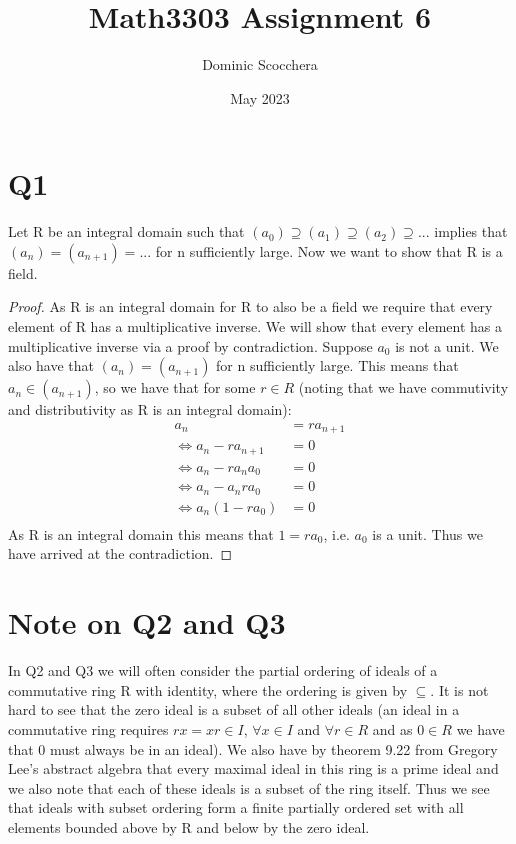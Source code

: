\documentclass{article}
\title{Math3303 Assignment 6}
\author{Dominic Scocchera}
\date{May 2023}
\theoremstyle{definition}
\begin{document}
\maketitle
\section*{Q1}
Let R be an integral domain such that $(a_0)\supseteq(a_1)\supseteq(a_2)\supseteq...$ implies that $(a_n)=(a_{n+1})=...$ for n sufficiently large. Now we want to show that R is a field.
\begin{proof}
As R is an integral domain for R to also be a field we require that every element of R has a multiplicative inverse. We will show that every element has a multiplicative inverse via a proof by contradiction. Suppose $a_0$ is not a unit. We also have that $(a_n)=(a_{n+1})$ for n sufficiently large. This means that $a_n\in(a_{n+1})$, so we have that for some $r\in R$ (noting that we have commutivity and distributivity as R is an integral domain):
\begin{align*}
a_n&=ra_{n+1}\\
\iff a_n-ra_{n+1}&=0\\
\iff a_n-ra_na_0&=0\\
\iff a_n-a_nra_0&=0\\
\iff a_n(1-ra_0)&=0\\
\end{align*}
As R is an integral domain this means that $1=ra_0$, i.e. $a_0$ is a unit. Thus we have arrived at the contradiction.  
\end{proof}
\section*{Note on Q2 and Q3}
In Q2 and Q3 we will often consider the partial ordering of ideals of a commutative ring R with identity, where the ordering is given by $\subseteq$. It is not hard to see that the zero ideal is a subset of all other ideals (an ideal in a commutative ring requires $rx=xr\in I$, $\forall x\in I$ and $\forall r\in R$ and as $0\in R$ we have that 0 must always be in an ideal). We also have by theorem 9.22 from Gregory Lee's abstract algebra that every maximal ideal in this ring is a prime ideal and we also note that each of these ideals is a subset of the ring itself. Thus we see that ideals with subset ordering form a finite partially ordered set with all elements bounded above by R and below by the zero ideal.
\end{document}
